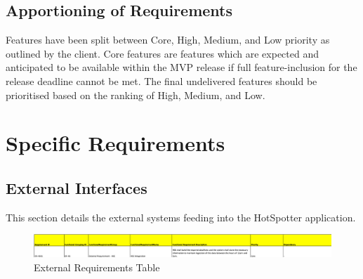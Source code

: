\documentclass{scrreprt}
\begin{document}
\section{Apportioning of Requirements}
Features have been split between Core, High, Medium, and Low priority as outlined by the client. Core features are features which are expected and anticipated to be available within the MVP release if full feature-inclusion for the release deadline cannot be met. The final undelivered features should be prioritised based on the ranking of High, Medium, and Low.


\chapter{Specific Requirements}\label{Requirements}


\section{External Interfaces}
This section details the external systems feeding into the HotSpotter application.
\begin{figure}[H]
	\centering
	\includegraphics[page=1, width=0.95\linewidth]{COMP30830-ExternalRequirements}
	\caption{External Requirements Table}
	\label{FR}
\end{figure}
\end{document}
